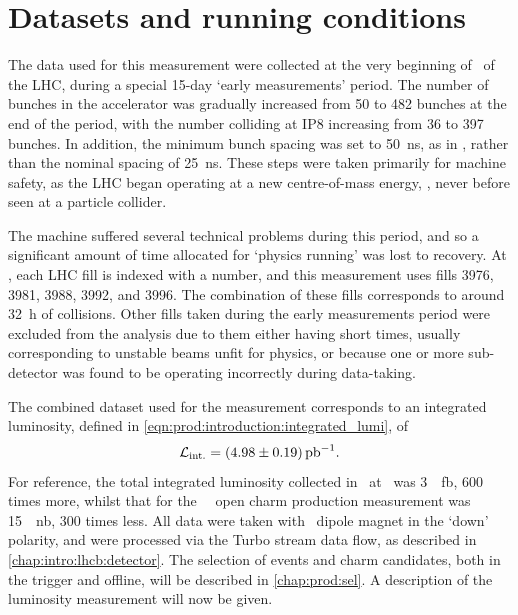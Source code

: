 \chapter{Datasets and running conditions}
\label{chap:prod:data}

The data used for this measurement were collected at the very beginning of 
\runtwo\ of the \ac{LHC}, during a special 15-day `early measurements' period.
The number of bunches in the accelerator was gradually increased from 50 to 482 
bunches at the end of the period, with the number colliding at IP8 increasing 
from 36 to 397 bunches.
In addition, the minimum bunch spacing was set to \SI{50}{\nano\second}, as in 
\runone, rather than the nominal \runtwo spacing of \SI{25}{\nano\second}.
These steps were taken primarily for machine safety, as the \ac{LHC} began 
operating at a new centre-of-mass energy, , never before seen at a 
particle collider.

The machine suffered several technical problems during this period, and so a 
significant amount of time allocated for `physics running' was lost to 
recovery.
At \lhcb, each \ac{LHC} fill is indexed with a number, and this measurement 
uses fills 3976, 3981, 3988, 3992, and 3996.
The combination of these fills corresponds to around \SI{32}{\hour} of 
collisions.
Other fills taken during the early measurements period were excluded from the 
analysis due to them either having short times, usually corresponding to 
unstable beams unfit for physics, or because one or more sub-detector was found 
to be operating incorrectly during data-taking.

The combined dataset used for the measurement corresponds to an integrated 
luminosity, defined in \cref{eqn:prod:introduction:integrated_lumi}, of
\begin{equation}
  \intlumi = \SI{\xsectotlumi}{\per\pico\barn}.
  \label{eqn:prod:xsectotlumi}
\end{equation}
For reference, the total integrated luminosity collected in \runone\ at \lhcb\ 
was \SI{3}{\per\femto\barn}, 600 times more, whilst that for the \ 
\lhcb\ open charm production measurement was \SI{15}{\per\nano\barn}, 300 times 
less.
All data were taken with \lhcb\ dipole magnet in the `down' polarity, and were 
processed via the Turbo stream data flow, as described in 
\cref{chap:intro:lhcb:detector}.
The selection of events and charm candidates, both in the trigger and offline, 
will be described in \cref{chap:prod:sel}.
A description of the luminosity measurement will now be given.

